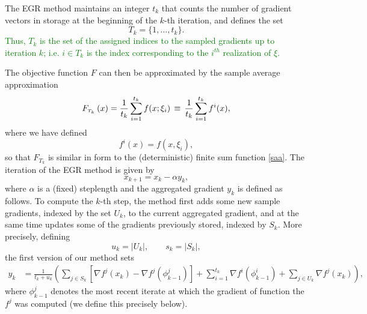 \documentclass[11pt]{article}
\newcommand{\tint}{\mbox{$F_{\mbox{{\it \tiny $T_k$ }}}$}}
\begin{document}
The EGR method maintains an integer $t_k $ that counts the number of gradient vectors in storage at the beginning of the $k$-th iteration, and defines the set 
\begin{equation} \label{capt}
         T_k = \{1, \ldots, t_k\}. 
 \end{equation}
 \textcolor{green}{Thus, $T_k$ is the set of the assigned indices to the sampled gradients up to iteration $k$; i.e. $i\in T_k$ is the index corresponding to the $i^{th}$ realization of $\xi$.}
 
 The objective function $F$ can then be approximated by the sample average approximation
\begin{equation}  \label{batch}
	\tint (x)= \frac{1}{t_k} \sum_{i =1}^{ t_k} f(x; \xi_i) \, \equiv \,  \frac{1}{t_k} \sum_{i =1}^{ t_k} f^i (x) ,
\end{equation}
where  we have defined
\begin{equation} \label{spring}
	f^i(x) =  f(x, \xi_i) ,
\end{equation}
so that $F_{T_k}$ is similar in form to the (deterministic) finite sum function \eqref{saa}.
The iteration of the EGR method is given by
\begin{equation}  \label{egri}
        x_{k+1}= x_k - \alpha y_k ,
\end{equation}
where $\alpha$ is a (fixed) steplength and the aggregated gradient $y_k$ is defined as follows. To compute the $k$-th step, the method first adds some new sample gradients, indexed by the set $U_k$, to the current aggregated gradient, and at the same time updates some of the gradients previously stored, indexed by $S_k$. More precisely, defining
\begin{equation}   \label{usdef}
      u_k = | U_k |, \qquad s_k = | S_k |,
\end{equation}
the first version of our method sets
\begin{align}  \label{ysag}
      y_k & =  \frac{1}{t_{k}+u_k}  \left( \sum_{j \in S_k} \left[  \nabla f^j(x_{k}) -  \nabla f^j(\phi_{k-1}^j)\right]+ \sum_{i = 1}^{t_{k} }  \nabla f^i (\phi^i_{k-1})  + \sum_{j \in U_k} \nabla f^j(x_k) \right) ,
\end{align}
where  $\phi_{k-1}^j$ denotes the most recent iterate at which the gradient of function the $f^j$ was computed (we define this precisely below). 
\end{document}

